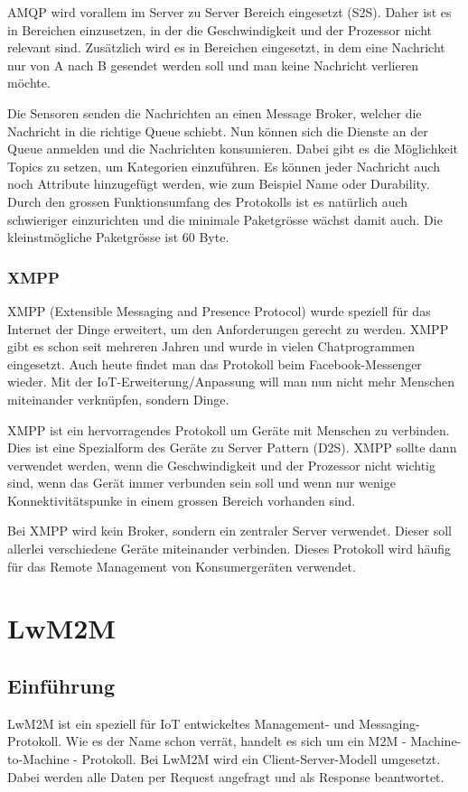 AMQP wird vorallem im Server zu Server Bereich eingesetzt (S2S).\cite{ProtPubSub} Daher ist es in Bereichen einzusetzen, in der die Geschwindigkeit und der Prozessor nicht relevant sind. Zusätzlich wird es in Bereichen eingesetzt, in dem eine Nachricht nur von A nach B gesendet werden soll und man keine Nachricht verlieren möchte.

Die Sensoren senden die Nachrichten an einen Message Broker, welcher die Nachricht in die richtige Queue schiebt. Nun können sich die Dienste an der Queue anmelden und die Nachrichten konsumieren. Dabei gibt es die Möglichkeit Topics zu setzen, um Kategorien einzuführen. Es können jeder Nachricht auch noch Attribute hinzugefügt werden, wie zum Beispiel Name oder Durability. Durch den grossen Funktionsumfang des Protokolls ist es natürlich auch schwieriger einzurichten und die minimale Paketgrösse wächst damit auch. Die kleinstmögliche Paketgrösse ist 60 Byte.
\subsubsection{XMPP}
XMPP (Extensible Messaging and Presence Protocol) wurde speziell für das Internet der Dinge erweitert, um den Anforderungen gerecht zu werden. XMPP gibt es schon seit mehreren Jahren und wurde in vielen Chatprogrammen eingesetzt. Auch heute findet man das Protokoll beim Facebook-Messenger wieder. Mit der IoT-Erweiterung/Anpassung will man nun nicht mehr Menschen miteinander verknüpfen, sondern Dinge. 

XMPP ist ein hervorragendes Protokoll um Geräte mit Menschen zu verbinden. Dies ist eine Spezialform des Geräte zu Server Pattern (D2S). \cite{ProtPubSub} XMPP sollte dann verwendet werden, wenn die Geschwindigkeit und der Prozessor nicht wichtig sind, wenn das Gerät immer verbunden sein soll und wenn nur wenige Konnektivitätspunke in einem grossen Bereich vorhanden sind.\cite{ProtPubSubReason}

Bei XMPP wird kein Broker, sondern ein zentraler Server verwendet. Dieser soll allerlei verschiedene Geräte miteinander verbinden. Dieses Protokoll wird häufig für das Remote Management von Konsumergeräten verwendet.

\newpage

\section{LwM2M}
\label{sec:lwm2m}
\subsection{Einführung}
LwM2M ist ein speziell für IoT entwickeltes Management- und Messaging-Protokoll. Wie es der Name schon verrät, handelt es sich um ein M2M - Machine-to-Machine - Protokoll. Bei LwM2M wird ein Client-Server-Modell umgesetzt. Dabei werden alle Daten per Request angefragt und als Response beantwortet.

